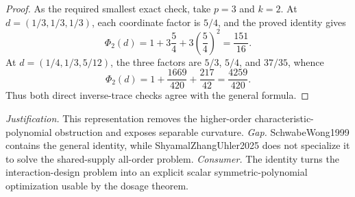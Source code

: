 \documentclass{article}
\begin{document}
\begin{proof}
As the required smallest exact check, take \(p=3\) and \(k=2\).  At \(d=(1/3,1/3,1/3)\), each coordinate factor is \(5/4\), and the proved identity gives
\[
 \Phi_2(d)=1+3\frac54+3\left(\frac54\right)^2=\frac{151}{16}.
\]
At \(d=(1/4,1/3,5/12)\), the three factors are \(5/3\), \(5/4\), and \(37/35\), whence
\[
 \Phi_2(d)=1+\frac{1669}{420}+\frac{217}{42}=\frac{4259}{420}.
\]
Thus both direct inverse-trace checks agree with the general formula.
\end{proof}
\par\smallskip\noindent \textit{Justification.} This representation removes the higher-order characteristic-polynomial obstruction and exposes separable curvature. \textit{Gap.} SchwabeWong1999 contains the general identity, while ShyamalZhangUhler2025 does not specialize it to solve the shared-supply all-order problem. \textit{Consumer.} The identity turns the interaction-design problem into an explicit scalar symmetric-polynomial optimization usable by the dosage theorem.
\end{document}
